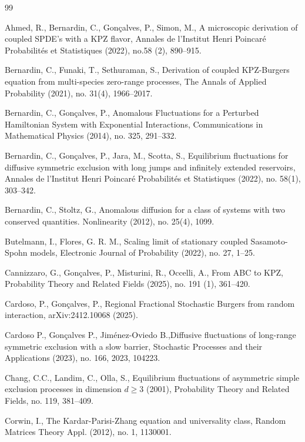 \documentclass[a4paper, reqno, 12pt]{amsart}
\theoremstyle{plain}
\theoremstyle{definition}
\begin{document}
\begin{thebibliography}{99}

 Ahmed, R., Bernardin, C., Gon\c{c}alves, P., Simon, M., A microscopic derivation of coupled SPDE’s with a KPZ flavor, Annales de l'Institut Henri Poincaré Probabilités et Statistiques (2022), no.58 (2), 890--915.

 Bernardin, C., Funaki, T., Sethuraman, S., Derivation of coupled KPZ-Burgers equation from multi-species zero-range processes, The Annals of Applied Probability (2021), no. 31(4), 1966--2017.

 Bernardin, C., Gon\c{c}alves, P., Anomalous Fluctuations for a Perturbed Hamiltonian System with Exponential Interactions, Communications in Mathematical Physics (2014), no. 325, 291--332.

 Bernardin, C., Gon\c{c}alves, P., Jara, M., Scotta, S., Equilibrium fluctuations for diffusive symmetric exclusion with long jumps and infinitely extended reservoirs, Annales de l'Institut Henri Poincaré Probabilités et Statistiques (2022), no. 58(1), 303--342.

 Bernardin, C., Stoltz, G., Anomalous diffusion for a class of systems with two conserved quantities. Nonlinearity (2012), no. 25(4), 1099.

 Butelmann, I., Flores, G. R. M., Scaling limit of stationary coupled Sasamoto-Spohn models, Electronic Journal of Probability (2022), no. 27, 1--25.

 Cannizzaro, G., Gon\c{c}alves, P., Misturini, R., Occelli, A., From ABC to KPZ, Probability Theory and Related Fields (2025), no. 191 (1), 361--420.


 Cardoso, P., Gon\c{c}alves, P., Regional Fractional Stochastic Burgers from random interaction, arXiv:2412.10068 (2025).

 Cardoso P., Gon\c{c}alves P., Jiménez-Oviedo B.,Diffusive fluctuations of long-range symmetric exclusion with a slow barrier,
Stochastic Processes and their Applications (2023), no. 166, 2023, 104223.


 Chang, C.C., Landim, C., Olla, S., Equilibrium fluctuations of asymmetric simple exclusion processes in dimension $d\ge 3$ (2001), Probability Theory and Related Fields, no. 119, 381--409.


 Corwin, I., The Kardar-Parisi-Zhang equation and universality class, {Random Matrices Theory Appl.} (2012),  no. 1, 1130001.


\end{thebibliography}
\end{document}
